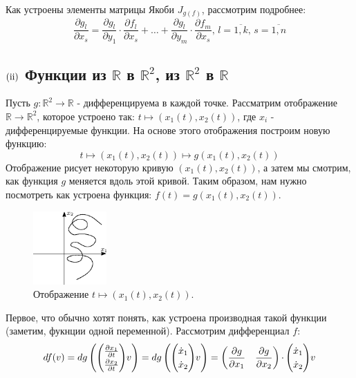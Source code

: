\documentclass[12pt]{article}
\newcommand{\RN}[1]{%
	\textup{\uppercase\expandafter{\romannumeral#1}}%
}
\newcommand{\MR}{\mathbb{R}}
\theoremstyle{definition}
\begin{document}
Как устроены элементы матрицы Якоби $J_{g(f)}$, рассмотрим подробнее:
$$
	\dfrac{\partial g_l}{\partial x_s} = \dfrac{\partial g_l}{\partial y_1}{\cdot}\dfrac{\partial f_l}{\partial x_s} + \dotsc + \dfrac{\partial g_l}{\partial y_m}{\cdot}\dfrac{\partial f_m}{\partial x_s}, \, l = \overline{1,k}, \, s = \overline{1,n}
$$
\newpage
\subsection*{$(\RN{2})$ Функции из $\MR$ в $\MR^2$, из $\MR^2$ в $\MR$}

Пусть $g \colon \MR^2 \to \MR$  - дифференцируема в каждой точке. Рассматрим отображение $\MR \to \MR^2$, которое устроено так: $t \mapsto (x_1(t), x_2(t))$, где $x_i$ - дифференцируемые функции. На основе этого отображения построим новую функцию: 
$$
	t \mapsto (x_1(t), x_2(t)) \mapsto g(x_1(t),x_2(t))
$$ 
Отображение рисует некоторую кривую $(x_1(t),x_2(t))$, а затем мы смотрим, как функция $g$ меняется вдоль этой кривой. Таким образом, нам нужно посмотреть как устроена функция: $f(t) = g(x_1(t),x_2(t))$.
\begin{figure}[H]
	\centering
	\includegraphics[width=0.25\textwidth]{14_1.eps}
	\caption{Отображение $t \mapsto (x_1(t),x_2(t))$.}
	\label{14_1}
\end{figure}
Первое, что обычно хотят понять, как устроена производная такой функции (заметим, фукнции одной переменной). Рассмотрим дифференциал $f$:
$$
	df(v) = dg 
	\renewcommand\arraystretch{1.2}
	\begin{pmatrix}
		\begin{pmatrix}
			\tfrac{\partial x_1}{\partial t}\\
			\tfrac{\partial x_2}{\partial t}
		\end{pmatrix} \! v
	\end{pmatrix}
	= dg 
	\begin{pmatrix}
		\begin{pmatrix}
			\dot{x}_1\\
			\dot{x}_2
		\end{pmatrix} \! v
	\end{pmatrix} = 
	\begin{pmatrix}
		\dfrac{\partial g}{\partial x_1} & \dfrac{\partial g}{\partial x_2}
	\end{pmatrix}{\cdot}
	\begin{pmatrix}
		\dot{x}_1\\
		\dot{x}_2
	\end{pmatrix} \! v
$$
\end{document}
